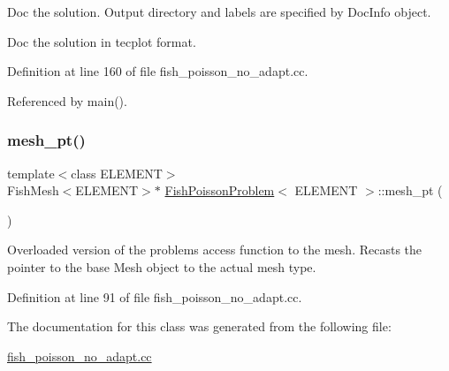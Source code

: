 Doc the solution. Output directory and labels are specified by Doc\+Info object. 

Doc the solution in tecplot format. 

Definition at line 160 of file fish\+\_\+poisson\+\_\+no\+\_\+adapt.\+cc.



Referenced by main().

\mbox{\label{classFishPoissonProblem_a084fca53b2a82803d07326ba27af75ec}} 
\subsubsection{\texorpdfstring{mesh\+\_\+pt()}{mesh\_pt()}}
{\footnotesize\ttfamily template$<$class E\+L\+E\+M\+E\+NT$>$ \\
Fish\+Mesh$<$E\+L\+E\+M\+E\+NT$>$$\ast$ \hyperlink{classFishPoissonProblem}{Fish\+Poisson\+Problem}$<$ E\+L\+E\+M\+E\+NT $>$\+::mesh\+\_\+pt (\begin{DoxyParamCaption}{ }\end{DoxyParamCaption})\hspace{0.3cm}{\ttfamily [inline]}}



Overloaded version of the problem\textquotesingle{}s access function to the mesh. Recasts the pointer to the base Mesh object to the actual mesh type. 



Definition at line 91 of file fish\+\_\+poisson\+\_\+no\+\_\+adapt.\+cc.



The documentation for this class was generated from the following file\+:\begin{DoxyCompactItemize}
\item 
\hyperlink{fish__poisson__no__adapt_8cc}{fish\+\_\+poisson\+\_\+no\+\_\+adapt.\+cc}\end{DoxyCompactItemize}
